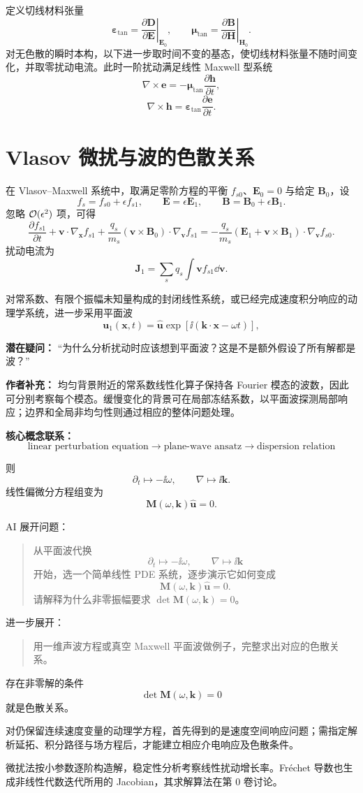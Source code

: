 定义切线材料张量
\[
\bm\varepsilon_{\mathrm{tan}}
=
\left.\frac{\partial\bm D}{\partial\bm E}\right|_{\bm E_0},
\qquad
\bm\mu_{\mathrm{tan}}
=
\left.\frac{\partial\bm B}{\partial\bm H}\right|_{\bm H_0}.
\]
对无色散的瞬时本构，以下进一步取时间不变的基态，使切线材料张量不随时间变化，并取零扰动电流。此时一阶扰动满足线性 Maxwell 型系统
\[
\nabla\times\bm e
=
-\bm\mu_{\mathrm{tan}}\frac{\partial\bm h}{\partial t},
\]
\[
\nabla\times\bm h
=
\bm\varepsilon_{\mathrm{tan}}\frac{\partial\bm e}{\partial t}.
\]

\section{Vlasov 微扰与波的色散关系}
在 Vlasov--Maxwell 系统中，取满足零阶方程的平衡 $f_{s0}$、$\bm E_0=0$ 与给定 $\bm B_0$，设
\[
f_s=f_{s0}+\epsilon f_{s1},
\qquad
\bm E=\epsilon\bm E_1,
\qquad
\bm B=\bm B_0+\epsilon\bm B_1.
\]
忽略 \(\mathcal O(\epsilon^2)\) 项，可得
\[
\frac{\partial f_{s1}}{\partial t}
+\bm v\cdot\nabla_{\bm x}f_{s1}
+\frac{q_s}{m_s}
(\bm v\times\bm B_0)\cdot\nabla_{\bm v}f_{s1}
=
-\frac{q_s}{m_s}
(\bm E_1+\bm v\times\bm B_1)
\cdot\nabla_{\bm v}f_{s0}.
\]
扰动电流为
\[
\bm J_1=\sum_s q_s\int \bm v f_{s1}\dd\bm v.
\]

对常系数、有限个振幅未知量构成的封闭线性系统，或已经完成速度积分响应的动理学系统，进一步采用平面波
\[
\bm u_1(\bm x,t)
=
\widehat{\bm u}
\exp[\ii(\bm k\cdot\bm x-\omega t)],
\]

\begin{authornote}
\textbf{潜在疑问：}
“为什么分析扰动时应该想到平面波？这是不是额外假设了所有解都是波？”

\textbf{作者补充：}
均匀背景附近的常系数线性化算子保持各 Fourier 模态的波数，因此可分别考察每个模态。缓慢变化的背景可在局部冻结系数，以平面波探测局部响应；边界和全局非均匀性则通过相应的整体问题处理。

\textbf{核心概念联系：}
\[
\text{linear perturbation equation}
\longrightarrow
\text{plane-wave ansatz}
\longrightarrow
\text{dispersion relation}
\]
\end{authornote}

则
\[
\partial_t\mapsto-\ii\omega,
\qquad
\nabla\mapsto\ii\bm k.
\]
线性偏微分方程组变为
\[
\bm M(\omega,\bm k)\widehat{\bm u}=0.
\]

\begin{askai}
AI 展开问题：
\begin{quote}
从平面波代换
\[
\partial_t\mapsto-\ii\omega,\qquad \nabla\mapsto\ii\bm k
\]
开始，选一个简单线性 PDE 系统，逐步演示它如何变成
\[
\bm M(\omega,\bm k)\widehat{\bm u}=0.
\]
请解释为什么非零振幅要求 \(\det\bm M(\omega,\bm k)=0\)。
\end{quote}

进一步展开：
\begin{quote}
用一维声波方程或真空 Maxwell 平面波做例子，完整求出对应的色散关系。
\end{quote}
\end{askai}

存在非零解的条件
\[
\det\bm M(\omega,\bm k)=0
\]
就是色散关系。

对仍保留连续速度变量的动理学方程，首先得到的是速度空间响应问题；需指定解析延拓、积分路径与场方程后，才能建立相应介电响应及色散条件。

微扰法按小参数逐阶构造解，稳定性分析考察线性扰动增长率。Fr\'echet 导数也生成非线性代数迭代所用的 Jacobian，其求解算法在第 0 卷讨论。
